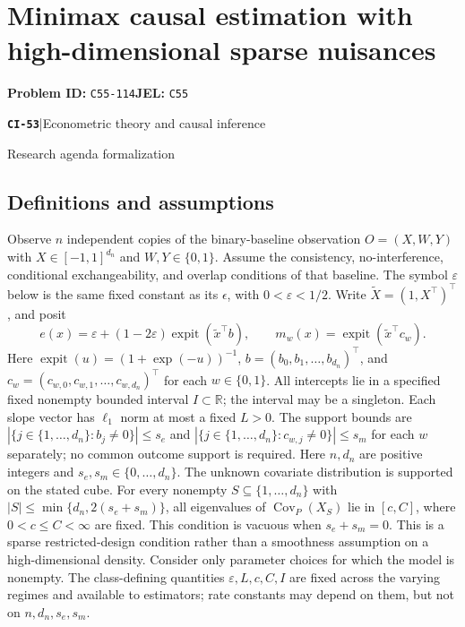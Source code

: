 \documentclass[11pt,a4paper]{article}
\newcommand{\R}{\mathbb R}
\newcommand{\Cov}{\operatorname{Cov}}
\newcommand{\entrymeta}[3]{{\sffamily\small\color{muted}\textbf{\texttt{#1}}\quad|\quad #2\par #3\par}}
\begin{document}
\section*{Minimax causal estimation with high-dimensional sparse nuisances}
\textbf{Problem ID:} \texttt{C55-114}\quad \textbf{JEL:} \texttt{C55}\par
\label{problem:OP-0532}
\label{beyond:CI-53}
\entrymeta{CI-53}{Econometric theory and causal inference}{Research agenda formalization}
\subsection*{Definitions and assumptions}
Observe $n$ independent copies of the binary-baseline observation $O=(X,W,Y)$ with $X\in[-1,1]^{d_n}$ and $W,Y\in\{0,1\}$. Assume the consistency, no-interference, conditional exchangeability, and overlap conditions of that baseline. The symbol $\varepsilon$ below is the same fixed constant as its $\epsilon$, with $0<\varepsilon<1/2$. Write $\widetilde X=(1,X^\top)^\top$, and posit
\[
 e(x)=\varepsilon+(1-2\varepsilon)
             \operatorname{expit}(\widetilde x^\top b),\qquad
 m_w(x)=\operatorname{expit}(\widetilde x^\top c_w).
\]
Here $\operatorname{expit}(u)=(1+\exp(-u))^{-1}$, $b=(b_0,b_1,\ldots,b_{d_n})^\top$, and $c_w=(c_{w,0},c_{w,1},\ldots,c_{w,d_n})^\top$ for each $w\in\{0,1\}$. All intercepts lie in a specified fixed nonempty bounded interval $I\subset\R$; the interval may be a singleton. Each slope vector has $\ell_1$ norm at most a fixed $L>0$. The support bounds are $|\{j\in\{1,\ldots,d_n\}:b_j\ne0\}|\leq s_e$ and $|\{j\in\{1,\ldots,d_n\}:c_{w,j}\ne0\}|\leq s_m$ for each $w$ separately; no common outcome support is required. Here $n,d_n$ are positive integers and $s_e,s_m\in\{0,\ldots,d_n\}$. The unknown covariate distribution is supported on the stated cube. For every nonempty $S\subseteq\{1,\ldots,d_n\}$ with $|S|\leq\min\{d_n,2(s_e+s_m)\}$, all eigenvalues of $\Cov_P(X_S)$ lie in $[c,C]$, where $0<c\leq C<\infty$ are fixed. This condition is vacuous when $s_e+s_m=0$. This is a sparse restricted-design condition rather than a smoothness assumption on a high-dimensional density. Consider only parameter choices for which the model is nonempty. The class-defining quantities $\varepsilon,L,c,C,I$ are fixed across the varying regimes and available to estimators; rate constants may depend on them, but not on $n,d_n,s_e,s_m$.
\end{document}
